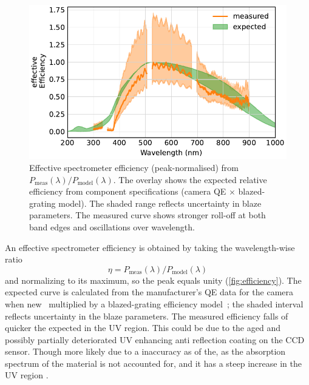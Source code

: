 \documentclass[
	parskip=half,
	a4paper,
]{scrarticle}
\begin{document}
\begin{figure}
    \centering
    \includegraphics{../analysis/figures/efficiency de.pdf}
    \caption{Effective spectrometer efficiency (peak-normalised) from \(P_{\text{meas}}(\lambda)/P_{\text{model}}(\lambda)\). The overlay shows the expected relative efficiency from component specifications (camera QE \(\times\) blazed-grating model). The shaded range reflects uncertainty in blaze parameters. The measured curve shows stronger roll-off at both band edges and oscillations over wavelength.}
    \label{fig:efficiency}
\end{figure}
An effective spectrometer efficiency is obtained by taking the wavelength-wise ratio \[\eta = P_{\text{meas}}(\lambda)/P_{\text{model}}(\lambda)\] and normalizing to its maximum, so the peak equals unity (\autoref{fig:efficiency}). The expected curve is calculated from the manufacturer’s QE data for the camera when new~\cite{andor_ixonem_nodate} multiplied by a blazed-grating efficiency model~\cite{barker_ripple_1984}; the shaded interval reflects uncertainty in the blaze parameters.
The measured efficiency falls of quicker the expected in the UV region.
This could be due to the aged and possibly partially deteriorated UV enhancing anti reflection coating on the CCD sensor.
Though more likely due to a inaccuracy as of the, as the absorption spectrum of the material is not accounted for, and it has a steep increase in the UV region \cite{smausz_determination_2017}.
\end{document}
